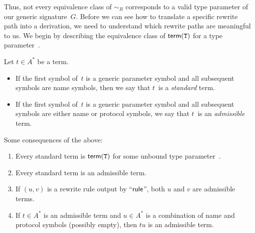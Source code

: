 \documentclass[../generics]{subfiles}
\begin{document}
Thus, not every equivalence class of $\sim_R$ corresponds to a valid type parameter of our generic signature~$G$. Before we can see how to translate a specific rewrite path into a derivation, we need to understand which rewrite paths are meaningful to us. We begin by describing the equivalence class of $\mathsf{term}(\texttt{T})$ for a type parameter~\tT.

\begin{definition}
Let $t\in A^*$ be a term.
\begin{itemize}
\item If the first symbol of~$t$ is a generic parameter symbol and all subsequent symbols are name symbols, then we say that $t$~is a \emph{standard} term.

\item If the first symbol of~$t$ is a generic parameter symbol and all subsequent symbols are either name or protocol symbols, we say that $t$~is an \emph{admissible} term.
\end{itemize}
\end{definition}

\begin{lemma}
Some consequences of the above:
\begin{enumerate}
\item Every standard term is $\mathsf{term}(\texttt{T})$ for some unbound type parameter~\tT.
\item Every standard term is an admissible term.
\item If $(u,v)$ is a rewrite rule output by ``$\mathsf{rule}$'', both $u$ and $v$ are admissible terms.
\item If $t\in A^*$ is an admissible term and $u\in A^*$ is a combination of name and protocol symbols (possibly empty), then $tu$ is an admissible term.
\end{enumerate}
\end{lemma}
\end{document}
